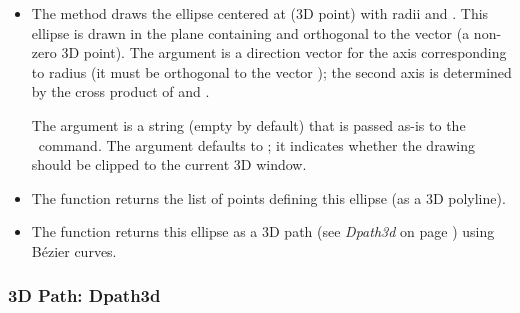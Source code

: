 \begin{itemize}
    \item The method  draws the ellipse centered at  (3D point) with radii  and . This ellipse is drawn in the plane containing  and orthogonal to the vector  (a non-zero 3D point). The argument  is a direction vector for the axis corresponding to radius  (it must be orthogonal to the vector ); the second axis is determined by the cross product of  and . 

    The argument  is a string (empty by default) that is passed as-is to the \drawcmd\ command. The argument  defaults to \false; it indicates whether the drawing should be clipped to the current 3D window. 

    \item The function  returns the list of points defining this ellipse (as a 3D polyline). 

    \item The function  returns this ellipse as a 3D path (see \emph{Dpath3d} on page \pageref{Dpath3d}) using Bézier curves.
\end{itemize}


\subsubsection{3D Path: Dpath3d}\label{Dpath3d}

